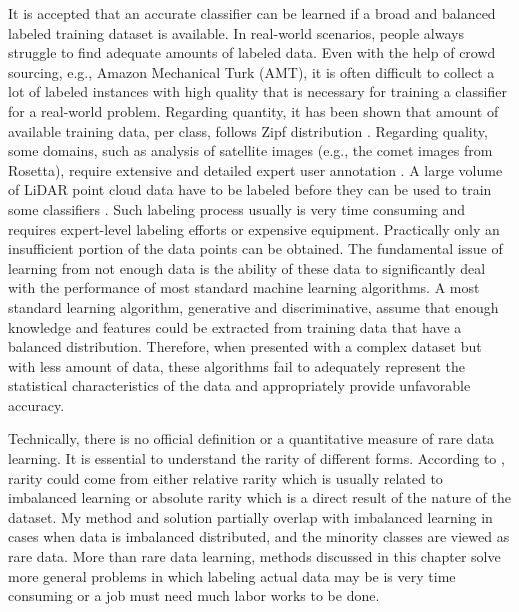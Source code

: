 \documentclass{iitthesis}
\begin{document}
\clearpage

 \label{chapter: data space}

 \label{dataspace: introduction}

It is accepted that an accurate classifier can be learned if a broad and balanced labeled training dataset is available. In real-world scenarios, people always struggle to find adequate amounts of labeled data. Even with the help of crowd sourcing, e.g., Amazon Mechanical Turk (AMT), it is often difficult to collect a lot of labeled instances with high quality that is necessary for training a classifier for a real-world problem. Regarding quantity, it has been shown that amount of available training data, per class, follows Zipf distribution \cite{torralba2011app_share}. Regarding quality, some domains, such as analysis of satellite images (e.g., the comet images from Rosetta), require extensive and detailed expert user annotation \cite{remotesensing2013}. A large volume of LiDAR point cloud data have to be labeled before they can be used to train some classifiers \cite{ZX:14}. Such labeling process usually is very time consuming and requires expert-level labeling efforts or expensive equipment. Practically only an insufficient portion of the data points can be obtained. The fundamental issue of learning from not enough data is the ability of these data to significantly deal with the performance of most standard machine learning algorithms. A most standard learning algorithm, generative and discriminative, assume that enough knowledge and features could be extracted from training data that have a balanced distribution. Therefore, when presented with a complex dataset but with less amount of data, these algorithms fail to adequately represent the statistical characteristics of the data and appropriately provide unfavorable accuracy.

Technically, there is no official definition or a quantitative measure of rare data learning. It is essential to understand the rarity of different forms. According to \cite{Weiss}, rarity could come from either relative rarity which is usually related to imbalanced learning or absolute rarity which is a direct result of the nature of the dataset. My method and solution partially overlap with imbalanced learning in cases when data is imbalanced distributed, and the minority classes are viewed as rare data. More than rare data learning, methods discussed in this chapter solve more general problems in which labeling actual data may be is very time consuming or a job must need much labor works to be done. 
\end{document}
